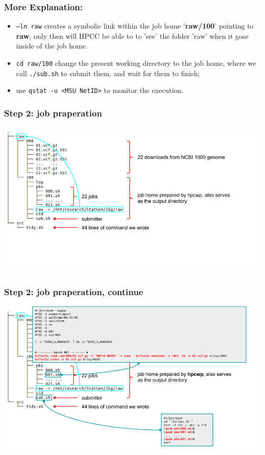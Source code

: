 \documentclass{beamer}
\begin{document}
\begin{frame}
\frametitle{More Explanation:}
\begin{itemize}
\item \texttt{--ln raw} creates a symbolic link within the job home
  '\textbf{raw/100}' pointing to \textbf{raw}, only then will HPCC be
  able to to 'see' the folder 'raw' when it gose inside of the job
  home.
\item {\color{red}\texttt{cd raw/100}} change the present working
  directory to the job home, where we call
  {\color{red}\texttt{./sub.sh}} to submit them, and wait for them to
  finish;
\item use \texttt{qstat -u <MSU NetID>} to monitor the execution.
\end{itemize}
\end{frame}
\begin{frame}
  \frametitle{Step 2: job praperation}
  \includegraphics[width=1.0\linewidth]{img/step_2_a}
\end{frame}
\begin{frame}
  \frametitle{Step 2: job praperation, continue}
  \includegraphics[width=1.0\linewidth]{img/step_2_b}
\end{frame}
\end{document}
